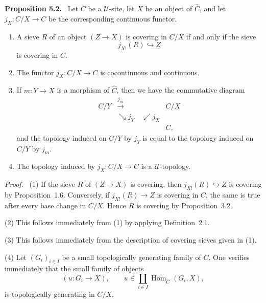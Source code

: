 \documentclass[11pt]{article}
\newcommand{\U}{\mathcal{U}}
\newcommand{\Hom}{\operatorname{Hom}}
\newenvironment{statement}[1]{\par\medskip\noindent\textbf{#1.}\ }{\par\medskip}
\newenvironment{prooftext}{\par\noindent\emph{Proof.}\ }{\par\medskip}
\begin{document}
\begin{statement}{Proposition 5.2}
Let \(C\) be a \(\U\)-site, let \(X\) be an object of \(\widehat C\), and let \(j_X:C/X\to C\) be the corresponding continuous functor.
\begin{enumerate}[label=\arabic*)]
\item A sieve \(R\) of an object \((Z\to X)\) is covering in \(C/X\) if and only if the sieve
\[
j_{X!}(R)\hookrightarrow Z
\]
is covering in \(C\).
\item The functor \(j_X:C/X\to C\) is cocontinuous and continuous.
\item If \(m:Y\to X\) is a morphism of \(\widehat C\), then we have the commutative diagram
\[
\begin{array}{ccc}
C/Y&\xrightarrow{j_m}&C/X\\
&\searrow j_Y\quad\swarrow j_X&\\[-0.8em]
&&C,
\end{array}
\]
and the topology induced on \(C/Y\) by \(j_Y\) is equal to the topology induced on \(C/Y\) by \(j_m\).
\item The topology induced by \(j_X:C/X\to C\) is a \(\U\)-topology.
\end{enumerate}
\end{statement}

\begin{prooftext}
(1) If the sieve \(R\) of \((Z\to X)\) is covering, then \(j_{X!}(R)\hookrightarrow Z\) is covering by Proposition~1.6. Conversely, if \(j_{X!}(R)\to Z\) is covering in \(C\), the same is true after every base change in \(C/X\). Hence \(R\) is covering by Proposition~3.2.

(2) This follows immediately from (1) by applying Definition~2.1.

(3) This follows immediately from the description of covering sieves given in (1).

(4) Let \((G_i)_{i\in I}\) be a small topologically generating family of \(C\). One verifies immediately that the small family of objects
\[
(u:G_i\to X),
\qquad
u\in\coprod_{i\in I}\Hom_{\widehat C}(G_i,X),
\]
is topologically generating in \(C/X\).
\end{prooftext}
\end{document}
